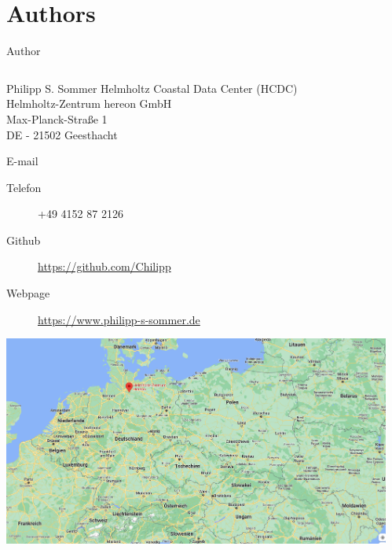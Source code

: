 
\section{Authors}  \label{sec:authors}

\begin{frame}{Author}
	\label{frm:author}
	\begin{columns}[T]
		\begin{column}{0.7\linewidth}
			\begin{block}{Philipp S. Sommer}
				Helmholtz Coastal Data Center (HCDC) \\
				Helmholtz-Zentrum hereon GmbH \\
				Max-Planck-Straße 1 \\
				DE - 21502 Geesthacht \\
				\vspace{0.5em}
				\begin{description}
					\item[E-mail] \href{mailto:\authoremail}{\authoremail}
					\item[Telefon] +49 4152 87 2126
					\item[Github] \url{https://github.com/Chilipp}
					\item[Webpage] \url{https://www.philipp-s-sommer.de}
				\end{description}
				\hyperlink{frm:map}{\includegraphics[width=0.25\linewidth]{figures/hereon-map.png}}
			\end{block}
		\end{column}
		\begin{column}{0.25\linewidth}

\end{column}
\end{columns}
\end{frame}
